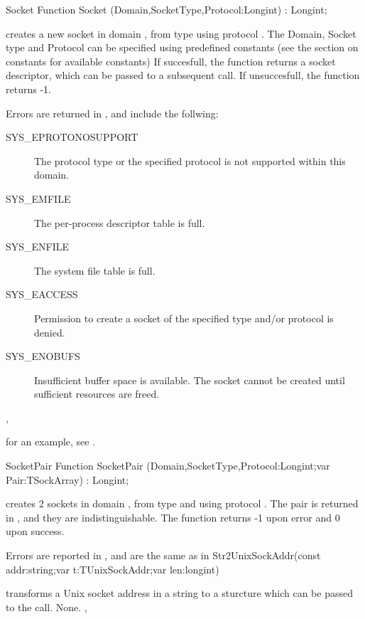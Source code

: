 \begin{function}{Socket}
\Declaration
Function Socket (Domain,SocketType,Protocol:Longint) : Longint;

\Description
{} creates a new socket in domain , from type
 using protocol .
The Domain, Socket type and Protocol can be specified using predefined
constants (see the section on constants for available constants)
If succesfull, the function returns a socket descriptor, which can be passed
to a subsequent  call. If unsuccesfull, the function returns -1.

\Errors
Errors are returned in , and include the follwing:
\begin{description}
\item[SYS\_EPROTONOSUPPORT]
The protocol type or the specified protocol is not
supported within this domain.
\item[SYS\_EMFILE]
The per-process descriptor table is full.
\item[SYS\_ENFILE]
The system file table is full.
\item[SYS\_EACCESS]
 Permission  to  create  a  socket of the specified
 type and/or protocol is denied.
\item[SYS\_ENOBUFS]
 Insufficient  buffer  space  is  available.    The
 socket   cannot   be   created   until  sufficient
 resources are freed.
\end{description}
\SeeAlso
{}, 
\end{function}
for an example, see .
\begin{function}{SocketPair}
\Declaration
Function SocketPair (Domain,SocketType,Protocol:Longint;var Pair:TSockArray) : Longint;

\Description
{} creates 2 sockets in domain , from type
 and using protocol .
The pair is returned in , and they are indistinguishable.
The function returns -1 upon error and 0 upon success.

\Errors
Errors are reported in , and are the same as in 
\SeeAlso
Str2UnixSockAddr{(const addr:string;var t:TUnixSockAddr;var len:longint)}
\end{function}
{ transforms a Unix socket address in a string to a
 sturcture which can be passed to the  call.
}
{None.}
{, }
